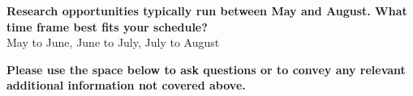 \documentclass[12pt,preprint]{aastex}
\begin{document}
\vspace*{3mm}
{\bf Research opportunities typically run between May and August.  What time frame best fits your schedule?}\\
May to June, June to July, July to August

\vspace*{3mm}
{\bf Please use the space below to ask questions or to convey any relevant additional information not covered above.}\\
\vspace*{3mm}

\vspace*{3mm}
\clearpage
\end{document}
